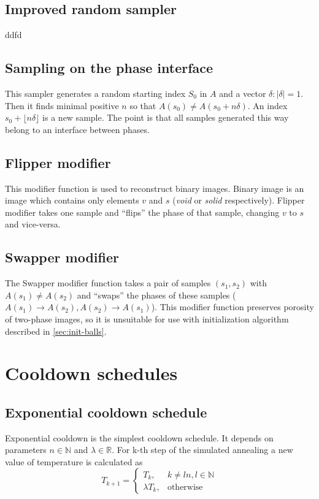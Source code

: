 \documentclass[preprint,amsmath,amssymb,aps,pre]{revtex4-1}
\begin{document}
\subsection{Improved random sampler}
\label{sec:sampler-dpn}
ddfd

\subsection{Sampling on the phase interface}
\label{sec:sampler-interface}
This sampler generates a random starting index $S_0$ in $A$ and a vector
$\delta: |\delta| = 1$. Then it finds minimal positive $n$ so that
$A(s_0) \ne A(s_0 + n\delta)$. An index $s_0 + \lfloor n\delta \rfloor$ is a new
sample. The point is that all samples generated this way belong to an interface
between phases.

\subsection{Flipper modifier}
\label{sec:flipper}
This modifier function is used to reconstruct binary images. Binary image is
an image which contains only elements $v$ and $s$ (\textit{void} or
\textit{solid} respectively). Flipper modifier takes one sample and ``flips''
the phase of that sample, changing $v$ to $s$ and vice-versa.

\subsection{Swapper modifier}
\label{sec:swapper}
The Swapper modifier function takes a pair of samples $(s_1, s_2)$ with
$A(s_1) \ne A(s_2)$ and ``swaps'' the phases of these samples
($A(s_1) \rightarrow A(s_2), A(s_2) \rightarrow A(s_1)$). This modifier function
preserves porosity of two-phase images, so it is unsuitable for use with
initialization algorithm described in \cref{sec:init-balls}.

\section{Cooldown schedules}
\label{sec:cooldown}
\subsection{Exponential cooldown schedule}
\label{sec:cooldown-exp}
Exponential cooldown is the simplest cooldown schedule. It depends on parameters
$n \in \mathbb{N}$ and $\lambda \in \mathbb{R}$. For k-th step of the simulated
annealing a new value of temperature is calculated as
\begin{equation*}
  T_{k+1} =
  \begin{cases}
    T_k, & k \ne ln, l \in \mathbb{N} \\
    \lambda T_k, & \text{otherwise}
  \end{cases}
\end{equation*}
\end{document}
